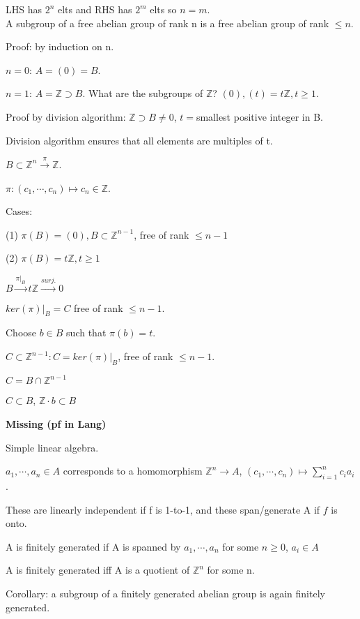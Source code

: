 \documentclass[12pt]{article}
\begin{document}
LHS has $2^n$ elts and RHS has $2^m$ elts so $n = m$. \\

\noindent
A subgroup of a free abelian group of rank n is a free abelian group of rank $\leq n$.

\noindent
Proof: by induction on n.

$n = 0$: $A = (0) = B$.

$n = 1$: $A = \mathds{Z} \supset B$.  What are the subgroups of $\mathds{Z}$? $(0), (t) = t\mathds{Z}, t \geq 1$.

Proof by division algorithm: $\mathds{Z} \supset B \neq 0$, $t = $smallest positive integer in B.

Division algorithm ensures that all elements are multiples of t.

$B \subset \mathds{Z}^n \xrightarrow{\pi} \mathds{Z}$.

$\pi: (c_1, \cdots, c_n) \mapsto c_n \in \mathds{Z}$.

\noindent
Cases:

(1) $\pi(B) = (0), B \subset \mathds{Z}^{n-1}$, free of rank $\leq n - 1$

(2) $\pi(B) = t\mathds{Z}, t \geq 1$

$B \xrightarrow{\pi|_B} t\mathds{Z} \xrightarrow{surj.} 0$

$ker(\pi)|_B = C$ free of rank $\leq n - 1$.

Choose $b \in B$ such that $\pi(b) = t$.

$C \subset \mathds{Z}^{n-1}: C = ker(\pi)|_B$, free of rank $\leq n - 1$.

$C = B \cap \mathds{Z}^{n - 1}$

$C \subset B$, $\mathds{Z} \cdot b \subset B$

\textbf{Missing (pf in Lang)}

\noindent
Simple linear algebra.

$a_1, \cdots, a_n \in A$ corresponds to a homomorphism $\mathds{Z}^n \to A$, $(c_1, \cdots, c_n) \mapsto \sum_{i = 1}^n c_ia_i$.

These are linearly independent if f is 1-to-1, and these span/generate A if $f$ is onto.

A is finitely generated if A is spanned by $a_1, \cdots, a_n$ for some $n \geq 0$, $a_i \in A$

A is finitely generated iff A is a quotient of $\mathds{Z}^n$ for some n.

\noindent
Corollary: a subgroup of a finitely generated abelian group is again finitely generated.
\end{document}
